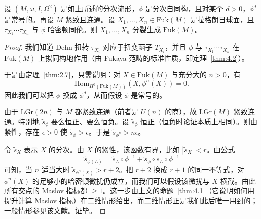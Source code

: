 
\begin{proposition}[{[19], 引理 9.2}]\label{prop:6.5}
设 $(M,\omega,I,\Omega^2)$ 是如上所述的分次流形，$\phi$ 是分次自同构，且对某个 $d>0$，$\phi^d$ 是常号的。再设 $M$ 紧致且连通。设 $X_1,\ldots,X_n\in\mathrm{Fuk}(M)$ 是拉格朗日球面，且 $\tau_{X_1}\cdots\tau_{X_n}$ 与 $\phi$ 哈密顿同伦。则 $X_1,\ldots,X_n$ 分裂生成 $\mathrm{Fuk}(M)$。
\end{proposition}

\begin{proof}
我们知道 Dehn 扭转 $\tau_{X_i}$ 对应于扭变函子 $T_{X_i}$，并且 $\phi$ 与 $\tau_{X_1}\cdots\tau_{X_n}$ 在 $\mathrm{Fuk}(M)$ 上拟同构地作用（由 Fukaya 范畴的标准性质，即定理~\ref{thm:4.2}）。

于是由定理~\ref{thm:2.7}，只需说明：对 $X\in\mathrm{Fuk}(M)$ 与充分大的 $n>0$，有
\[
\mathrm{Hom}_{H^0(\mathrm{Fuk}(M))}(X,\phi^n(X))=0.
\]
因此我们可以把 $\phi$ 换成 $\phi^d$，从而假设 $\phi$ 是常号的。

由于 $\mathrm{LGr}(2n)$ 与 $M$ 都紧致连通（前者是 $U(n)$ 的商），故 $\mathrm{LGr}(M)$ 紧致连通。特别地 $\tilde{s}_\phi$ 要么恒正、要么恒负。设 $\tilde{s}_\phi$ 恒正（恒负时论证本质上相同）。则由紧性，存在 $\epsilon>0$ 使 $\tilde{s}_\phi>\epsilon$。于是 $\tilde{s}_{\phi^n}>n\epsilon$。

令 $\tilde{s}_X$ 表示 $X$ 的分次。由 $X$ 的紧性，该函数有界，比如 $|\tilde{s}_X|<r$。由公式
\[
\tilde{s}_{\phi(L)}=\tilde{s}_L\circ\phi^{-1}+\tilde{s}_\phi\circ s_L\circ\phi^{-1}
\]
可知，当 $n$ 适当大时 $\tilde{s}_{\phi^n(X)}>r+2$。把 $r+2$ 换成 $r+1$ 的同一不等式，对 $\phi^n(X)$ 的足够小的哈密顿微扰仍成立，而我们可以假设该微扰与 $X$ 横截。由此所有交点的 Maslov 指标都 $\ge1$。这一步由上文的命题~\ref{thm:4.1}（它说明如何用提升计算 Maslov 指标）在二维情形给出，而二维情形正是我们此后唯一用到的；一般情形参见该文献。证毕。
\end{proof}



